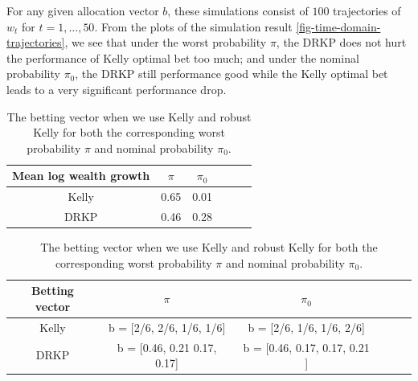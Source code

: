 \documentclass[12pt]{article}
\begin{document}
For any given allocation vector $b$, these simulations consist
of $100$ trajectories of $w_t$ for $t=1, \ldots, 50$. From the plots of the simulation result \ref{fig-time-domain-trajectories}, we see that under the worst probability $\pi$, the DRKP does not hurt the performance of Kelly optimal bet too much; and under the nominal probability $\pi_0$, the DRKP still performance good while the Kelly optimal bet leads to a very significant performance drop.
\begin{table}
\centering
\begin{tabular}{c|c|c|c||c|c}
      Mean log wealth growth  &   $\pi$ &   $\pi_0$ \\
      \hline
      Kelly &0.65 
      &0.01
       \\
      DRKP &0.46
      &0.28
      \\
      \hline
\end{tabular}
\caption{The mean of log wealth growth after $100$ days when we use Kelly and robust Kelly for both the corresponding worst probability $\pi$ and nominal probability $\pi_0$.}
\centering
\begin{tabular}{c|c|c|c||c|c}
      Betting vector &   $\pi$ &   $\pi_0$ \\
      \hline
      Kelly &b = [2/6,  2/6,  1/6,  1/6]
      &b = [2/6,  1/6,  1/6,  2/6]
       \\
      DRKP &b = [0.46, 0.21 0.17, 0.17] 
      &b = [0.46, 0.17, 0.17, 0.21 ]
      \\
      \hline
\end{tabular}
\caption{The betting vector when we use Kelly and robust Kelly for both the corresponding worst probability $\pi$ and nominal probability $\pi_0$.}
\end{table} 
\end{document}
